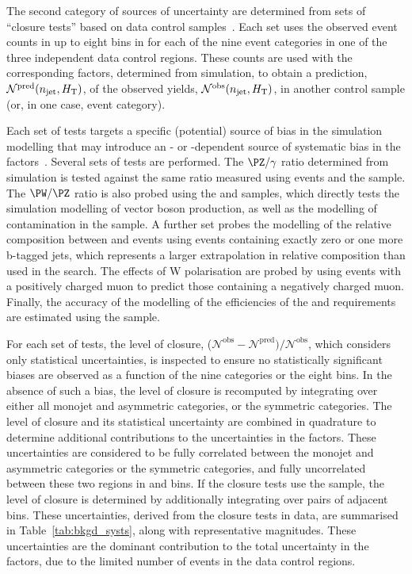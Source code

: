 The second category of sources of uncertainty are determined from sets
of ``closure tests'' based on data control
samples~\cite{RA1Paper2012}. Each set uses the observed event counts
in up to eight bins in \scalht for each of the nine \njet event
categories in one of the three independent data control regions. These
counts are used with the corresponding \tf factors, determined from
simulation, to obtain a prediction, $\mathcal{N}^\text{pred}(n_{\text{jet}},
H_{\mathrm{T}})$, of the observed yields, $\mathcal{N}^\text{obs}(n_{\text{jet}},
H_{\mathrm{T}})$, in another control sample (or, in one case, \nb event
category).

Each set of tests targets a specific (potential) source of bias in the
simulation modelling that may introduce an \njet- or \scalht-dependent
source of systematic bias in the \tf
factors~\cite{RA1Paper2012}. Several sets of tests are performed. The
$\PZ/\gamma$ ratio determined from simulation is tested against the
same ratio measured using \zmumuj events and the \gj sample.
The $\PW/\PZ$ ratio is also probed using the \mj and \mmj
samples, which directly tests the simulation modelling of vector
boson production, as well as the modelling of \ttbar contamination in
the \mj sample. 
A further set probes the modelling of the relative composition between
\wlj and \ttbar events using \mj events containing exactly zero or one
more b-tagged jets, which represents a larger extrapolation in
relative composition than used in the search.  The effects of W
polarisation are probed by using \mj events with a positively charged
muon to predict those containing a negatively charged muon. Finally,
the accuracy of the modelling of the efficiencies of the \alphat and
\bdphi requirements are estimated using the \mj sample.

For each set of tests, the level of closure, %
($\mathcal{N}^\text{obs} - \mathcal{N}^\text{pred}) /
\mathcal{N}^\text{obs}$, which considers only statistical
uncertainties, is inspected to ensure no statistically significant
biases are observed as a function of the nine \njet categories or the
eight \scalht bins. In the absence of such a bias, the level of
closure is recomputed by integrating over either all monojet and
asymmetric \njet categories, or the symmetric \njet categories. The
level of closure and its statistical uncertainty are combined in
quadrature to determine additional contributions to the uncertainties
in the \tf factors. These uncertainties are considered to be
fully correlated between the monojet and asymmetric \njet categories
or the symmetric \njet categories, and fully uncorrelated between
these two regions in \njet and \scalht bins. If the closure tests use
the \mmj sample, the level of closure is determined by additionally
integrating over pairs of adjacent \scalht bins. These uncertainties,
derived from the closure tests in data, are summarised in
Table~\ref{tab:bkgd_systs}, along with representative
magnitudes. These uncertainties are the dominant contribution to the
total uncertainty in the \tf factors, due to the limited number
of events in the data control regions.

